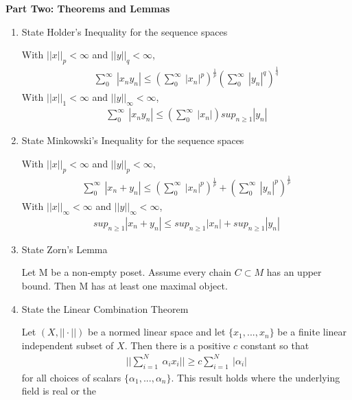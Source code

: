 \documentclass[11pt]{SelfArxOneColBMN}
\begin{document}
\textbf{Part Two: Theorems and Lemmas}
\begin{enumerate}
  \item State Holder's Inequality for the sequence spaces
  \begin{solution}
    With $||x||_p < \infty$ and $||y||_q < \infty$,
    \begin{eqnarray*}
      \sum_0^{\infty}\:|x_ny_n| \leq (\sum_0^{\infty}\:|x_n|^p)^\frac{1}{p}(\sum_0^{\infty}\:|y_n|^q)^{\frac{1}{q}}
    \end{eqnarray*}
    With $||x||_1 < \infty$ and $||y||_{\infty} < \infty$,
    \begin{eqnarray*}
      \sum_0^{\infty}\:|x_ny_n| \leq (\sum_0^{\infty}\:|x_n|)sup_{n \geq 1}|y_n|
    \end{eqnarray*}
  \end{solution}
  \item State Minkowski's Inequality for the sequence spaces
  \begin{solution}
    With $||x||_p < \infty$ and $||y||_p < \infty$,
    \begin{eqnarray*}
      \sum_0^{\infty}\:|x_n + y_n| \leq (\sum_0^{\infty}\:|x_n|^p)^\frac{1}{p} + (\sum_0^{\infty}\:|y_n|^p)^{\frac{1}{p}}
    \end{eqnarray*}
    With $||x||_{\infty} < \infty$ and $||y||_{\infty} < \infty$,
    \begin{eqnarray*}
      sup_{n \geq 1}|x_n + y_n| \leq sup_{n \geq 1}|x_n| + sup_{n \geq 1}|y_n|
    \end{eqnarray*}
  \end{solution}
  \item State Zorn's Lemma
  \begin{solution}
    Let M be a non-empty poset. Assume every chain $C \subset M$ has an upper bound. Then M has at least one maximal object.
  \end{solution}
  \item State the Linear Combination Theorem
  \begin{solution}
    Let $(X,||\cdot||)$ be a normed linear space and let $\{x_1,...,x_n\}$ be a finite linear independent subset of $X$. Then there is a positive ${c}$ constant so that
    \begin{eqnarray*}
      ||\sum_{i=1}^N\: \alpha_i {x_i}|| \geq c\sum_{i=1}^N\:|\alpha_i|
    \end{eqnarray*}
    for all choices of scalars $\{\alpha_1,...,\alpha_n\}$. This result holds where the underlying field is real or the
  \end{solution}

\end{enumerate}
\end{document}
